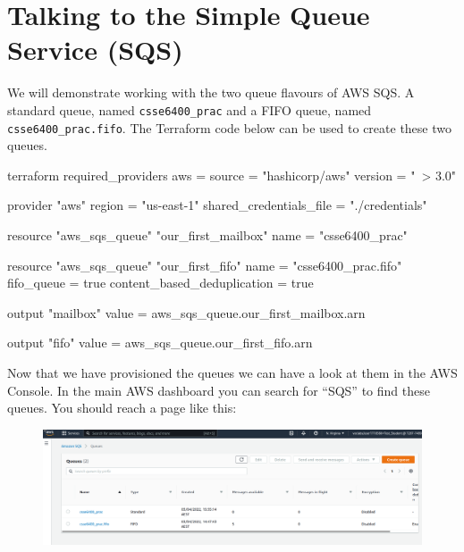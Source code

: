 \documentclass{csse4400}
\begin{document}

\section{Talking to the Simple Queue Service (SQS)}


We will demonstrate working with the two queue flavours of AWS SQS.
A standard queue, named \texttt{csse6400\_prac} and a FIFO queue, named \texttt{csse6400\_prac.fifo}.
The Terraform code below can be used to create these two queues.


\begin{code}[language=terraform, numbers=none]{}
terraform {
  required_providers {
    aws = {
      source = "hashicorp/aws"
      version = "~> 3.0"
    }
  }
}

provider "aws" {
  region = "us-east-1"
  shared_credentials_file = "./credentials"
}

resource "aws_sqs_queue" "our_first_mailbox" {
  name                        = "csse6400_prac"
}

resource "aws_sqs_queue" "our_first_fifo" {
  name                        = "csse6400_prac.fifo"
  fifo_queue                  = true
  content_based_deduplication = true
}

output "mailbox" {
  value = aws_sqs_queue.our_first_mailbox.arn
}

output "fifo" {
  value = aws_sqs_queue.our_first_fifo.arn
}
\end{code}

Now that we have provisioned the queues we can have a look at them in the AWS Console.
In the main AWS dashboard you can search for ``SQS'' to find these queues.
You should reach a page like this:

\begin{figure}[H]
  \includegraphics[width=\textwidth]{images/sqspanel}
\end{figure}
\end{document}
